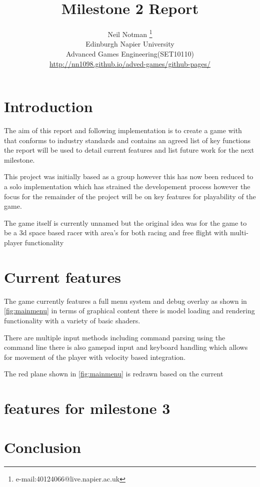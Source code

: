 \documentclass[conference,backref=page]{acmsiggraph}
\title{Milestone 2 Report}
\author{Neil Notman \thanks{e-mail:40124066@live.napier.ac.uk} \\
Edinburgh Napier University\\
Advanced Games Engineering(SET10110) \\
\url{http://nn1098.github.io/adved-games/github-pages/}}
\begin{document}

\maketitle


\keywordlist





\section{Introduction}
The aim of this report and following implementation is to create a game with that conforms to industry standards and contains an agreed list of key functions the report will be used to detail current features and list future work for the next milestone.

This project was initially based as a group however this has now been reduced to a solo implementation which has strained the developement process however the focus for the remainder of the project will be on key features for playability of the game.     

The game itself is currently unnamed but the original idea was for the game to be a 3d space based racer with area's for both racing and free flight with multi-player functionality  

\section{Current features}
The game currently features a full menu system and debug overlay as shown in \ref{fig:mainmenu} in terms of graphical content there is model loading and rendering functionality with a variety of basic shaders. 

There are multiple input methods including command parsing using the command line there is also gamepad input and keyboard handling which allows for movement of the player with velocity based integration. 


The red plane shown in \ref{fig:mainmenu} is redrawn based on the current 
\section{features for milestone 3}


\section{Conclusion}





\end{document}
